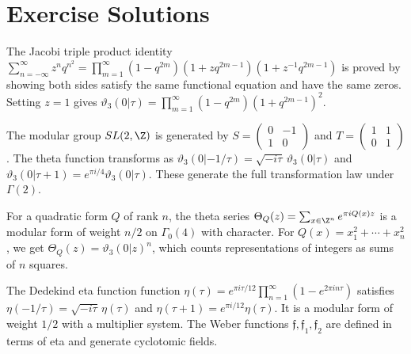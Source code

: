 \section{Exercise Solutions}

\begin{solution}
The Jacobi triple product identity $\sum_{n=-\infty}^{\infty} z^n q^{n^2} = \prod_{m=1}^{\infty}(1-q^{2m})(1+zq^{2m-1})(1+z^{-1}q^{2m-1})$ is proved by showing both sides satisfy the same functional equation and have the same zeros. Setting $z = 1$ gives $\vartheta_3(0|\tau) = \prod_{m=1}^{\infty}(1-q^{2m})(1+q^{2m-1})^2$.
\end{solution}

\begin{solution}
The modular group $SL(2,\Z)$ is generated by $S = \begin{pmatrix} 0 & -1 \\ 1 & 0 \end{pmatrix}$ and $T = \begin{pmatrix} 1 & 1 \\ 0 & 1 \end{pmatrix}$. The theta function transforms as $\vartheta_3(0|-1/\tau) = \sqrt{-i\tau}\,\vartheta_3(0|\tau)$ and $\vartheta_3(0|\tau+1) = e^{\pi i/4}\vartheta_3(0|\tau)$. These generate the full transformation law under $\Gamma(2)$.
\end{solution}

\begin{solution}
For a quadratic form $Q$ of rank $n$, the theta series $\Theta_Q(z) = \sum_{x \in \Z^n} e^{\pi i Q(x) z}$ is a modular form of weight $n/2$ on $\Gamma_0(4)$ with character. For $Q(x) = x_1^2 + \cdots + x_n^2$, we get $\Theta_Q(z) = \vartheta_3(0|z)^n$, which counts representations of integers as sums of $n$ squares.
\end{solution}

\begin{solution}
The Dedekind eta function function $\eta(\tau) = e^{\pi i \tau/12}\prod_{n=1}^{\infty}(1-e^{2\pi i n\tau})$ satisfies $\eta(-1/\tau) = \sqrt{-i\tau}\,\eta(\tau)$ and $\eta(\tau+1) = e^{\pi i/12}\eta(\tau)$. It is a modular form of weight $1/2$ with a multiplier system. The Weber functions $\mathfrak{f}, \mathfrak{f}_1, \mathfrak{f}_2$ are defined in terms of eta and generate cyclotomic fields.
\end{solution}
